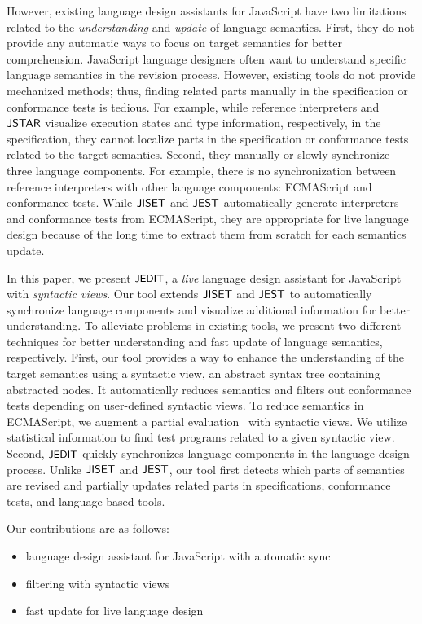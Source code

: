 However, existing language design assistants for JavaScript have two limitations
related to the \textit{understanding} and \textit{update} of language semantics.
First, they do not provide any automatic ways to focus on target semantics for
better comprehension. JavaScript language designers often want to understand
specific language semantics in the revision process. However, existing tools do
not provide mechanized methods; thus, finding related parts manually in the
specification or conformance tests is tedious. For example, while reference
interpreters and $\textsf{JSTAR}$ visualize execution states and type information,
respectively, in the specification, they cannot localize parts in the
specification or conformance tests related to the target semantics. Second, they
manually or slowly synchronize three language components. For example, there is
no synchronization between reference interpreters with other language
components: ECMAScript and conformance tests. While $\textsf{JISET}$ and $\textsf{JEST}$
automatically generate interpreters and conformance tests from ECMAScript, they
are appropriate for live language design because of the long time to extract
them from scratch for each semantics update.

In this paper, we present $\textsf{\small JEDIT}$, a \textit{live} language design assistant for
JavaScript with \textit{syntactic views}. Our tool extends $\textsf{JISET}$ and $\textsf{JEST}$
to automatically synchronize language components and visualize additional
information for better understanding. To alleviate problems in existing tools,
we present two different techniques for better understanding and fast update of
language semantics, respectively. First, our tool provides a way to enhance the
understanding of the target semantics using a syntactic view, an abstract syntax
tree containing abstracted nodes. It automatically reduces semantics and filters
out conformance tests depending on user-defined syntactic views. To reduce
semantics in ECMAScript, we augment a partial evaluation~\cite{peval,
peval-survey} with syntactic views. We utilize statistical information to find
test programs related to a given syntactic view. Second, $\textsf{\small JEDIT}$ quickly
synchronizes language components in the language design process. Unlike $\textsf{JISET}$
and $\textsf{JEST}$, our tool first detects which parts of semantics are revised and
partially updates related parts in specifications, conformance tests, and
language-based tools.

Our contributions are as follows:
\begin{itemize}
  \item \todo language design assistant for JavaScript with automatic sync
  \item \todo filtering with syntactic views
  \item \todo fast update for live language design
\end{itemize}
